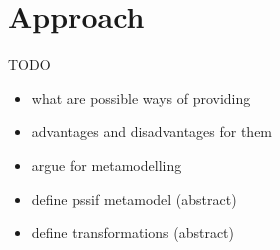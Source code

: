\chapter{Approach}
\label{chap:approach}

TODO

\begin{itemize}
\item what are possible ways of providing
\item advantages and disadvantages for them
\item argue for metamodelling
\item define pssif metamodel (abstract)
\item define transformations (abstract)
\end{itemize}
